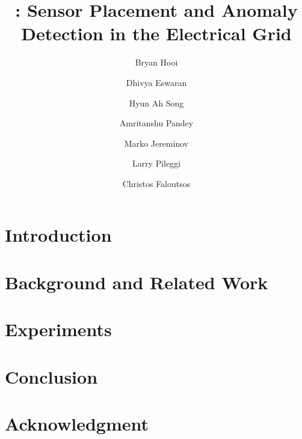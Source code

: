 \documentclass[runningheads]{llncs}
\begin{document}
\mainmatter  %

\title{\methodF: Sensor Placement and Anomaly Detection in the Electrical Grid}

\author{Bryan Hooi
\and Dhivya Eswaran
\and Hyun Ah Song
\and Amritanshu Pandey
\and Marko Jereminov
\and Larry Pileggi
\and Christos Faloutsos}
%


\maketitle

\begin{abstract}

\end{abstract}

\section{Introduction}
\label{sec:Introduction}


\section{Background and Related Work}
\label{sec:background}




\section{Experiments}
\label{sec:Results}


\section{Conclusion}
\label{sec:Conclusion}


\section{Acknowledgment}
\end{document}
